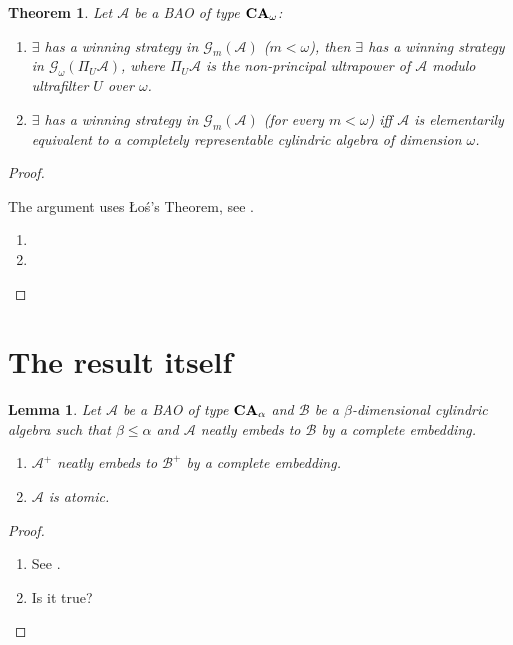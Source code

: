 \documentclass[a4paper]{article}
\theoremstyle{defin}
\theoremstyle{theorem}
\newtheorem{theorem}{Theorem}
\theoremstyle{prop}
\theoremstyle{lemma}
\newtheorem{lemma}{Lemma}
\theoremstyle{fact}
\theoremstyle{ex}
\theoremstyle{col}
\let\strokeL\L
\DeclareRobustCommand{\L}{\ifmmode\mathbf{L}\else\strokeL\fi}
\begin{document}
\begin{theorem} Let $\mathcal{A}$ be a BAO of type ${\bf CA}_{\omega}$:

\begin{enumerate}
  \item $\exists$ has a winning strategy in $\mathcal{G}_{m}(\mathcal{A})$ ($m < \omega$), then $\exists$ has a winning strategy in $\mathcal{G}_{\omega}(\Pi_U \mathcal{A})$, where $\Pi_U \mathcal{A}$ is the non-principal ultrapower of $\mathcal{A}$ modulo ultrafilter $U$ over $\omega$.
  \item $\exists$ has a winning strategy in $\mathcal{G}_{m}(\mathcal{A})$ (for every $m < \omega$) iff $\mathcal{A}$ is elementarily equivalent to a completely representable cylindric algebra of dimension $\omega$.
\end{enumerate}
\end{theorem}

\begin{proof}
  $ $

  The argument uses \L o\'s's Theorem, see \cite[Theorem 8.5.3]{hodges1997shorter}.

  \begin{enumerate}
    \item
    \item
  \end{enumerate}
\end{proof}

\section{The result itself}

\begin{lemma}\label{Neat}
  Let $\mathcal{A}$ be a BAO of type ${\bf CA}_{\alpha}$ and $\mathcal{B}$ be a $\beta$-dimensional cylindric algebra such that $\beta \leq \alpha$ and $\mathcal{A}$ neatly embeds to $\mathcal{B}$ by a complete embedding.

  \begin{enumerate}
  \item $\mathcal{A}^{+}$ neatly embeds to $\mathcal{B}^{+}$ by a complete embedding.
  \item $\mathcal{A}$ is atomic.
  \end{enumerate}
\end{lemma}

\begin{proof}
$ $

\begin{enumerate}
  \item See \cite[Remark 2.7.25]{henkin1971cylindric}.
  \item Is it true?
\end{enumerate}
\end{proof}
\end{document}
